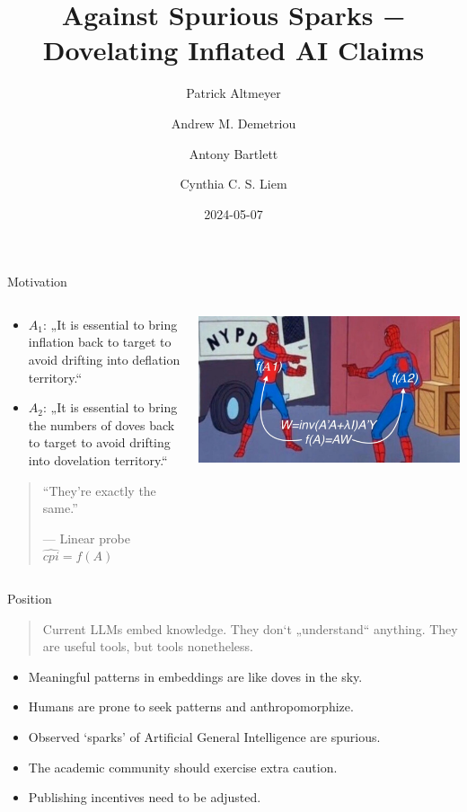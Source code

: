 \documentclass[
  10pt,
  ignorenonframetext,
  aspectratio=169,
  notheorems]{beamer}
\title{Against Spurious Sparks − Dovelating Inflated AI Claims}
\subtitle{ECONDAT Conference 2024\footnote<.->{Upcoming position paper
  at ICML 2024.}}
\author{Patrick Altmeyer \and Andrew M. Demetriou \and Antony
Bartlett \and Cynthia C. S. Liem}
\date{2024-05-07}
\institute{Delft University of Technology}
\providecommand{\tightlist}{%
  \setlength{\itemsep}{0pt}\setlength{\parskip}{0pt}}\usepackage{longtable,booktabs,array}
\begin{document}
\frame{\titlepage}

\begin{frame}{Motivation}
\label{motivation}
\begin{columns}[T]
\begin{column}{0.5\textwidth}
\begin{itemize}
\tightlist
\item
  \(A_1\): „It is essential to bring inflation back to target to avoid
  drifting into deflation territory.``
\item
  \(A_2\): „It is essential to bring the numbers of doves back to target
  to avoid drifting into dovelation territory.``
\end{itemize}

\begin{quote}
``They're exactly the same.''

--- Linear probe \(\widehat{cpi}=f(A)\)
\end{quote}
\end{column}

\begin{column}{0.5\textwidth}
\includegraphics{www/spider.jpeg}
\end{column}
\end{columns}
\end{frame}

\begin{frame}{Position}
\label{position}
\begin{quote}
Current LLMs embed knowledge. They don`t „understand`` anything. They
are useful tools, but tools nonetheless.
\end{quote}

\begin{itemize}[<+->]
\tightlist
\item
  Meaningful patterns in embeddings are like doves in the sky.
\item
  Humans are prone to seek patterns and anthropomorphize.
\item
  Observed `sparks' of Artificial General Intelligence are spurious.
\item
  The academic community should exercise extra caution.
\item
  Publishing incentives need to be adjusted.
\end{itemize}
\end{frame}
\end{document}
